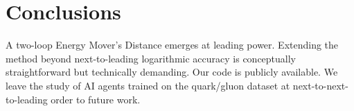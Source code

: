 \section{Conclusions}\label{sec:conclusions}

A two-loop Energy Mover's Distance emerges at leading power. Extending
the method beyond next-to-leading logarithmic accuracy is conceptually
straightforward but technically demanding. Our code is publicly
available. We leave the study of AI agents trained on the quark/gluon
dataset at next-to-next-to-leading order to future work.

